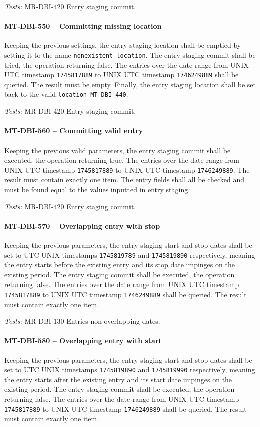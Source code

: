 \textit{Tests: } MR-DBI-420 Entry staging commit.

\paragraph{MT-DBI-550 -- Committing missing location}
Keeping the previous settings,
the entry staging location shall be emptied by setting it to the name
\lstinline{nonexistent_location}.
The entry staging commit shall be tried, the operation returning false.
The entries over the date range from UNIX UTC timestamp \lstinline{1745817889}
to UNIX UTC timestamp \lstinline{1746249889} shall be queried. The result must
be empty. Finally, the entry staging location shall be set back to the valid
\lstinline{location_MT-DBI-440}.

\textit{Tests: } MR-DBI-420 Entry staging commit.

\paragraph{MT-DBI-560 -- Committing valid entry}
Keeping the previous valid parameters,
the entry staging commit shall be executed, the operation returning true.
The entries over the date range from UNIX UTC timestamp \lstinline{1745817889}
to UNIX UTC timestamp \lstinline{1746249889}. The result must contain
exactly one item.
The entry fields shall all be checked and must be found equal to the
values inputted in entry staging.

\textit{Tests: } MR-DBI-420 Entry staging commit.

\paragraph{MT-DBI-570 -- Overlapping entry with stop}
Keeping the previous parameters, the entry staging start and stop dates
shall be set to UTC UNIX timestamps \lstinline{1745819789} and
\lstinline{1745819890} respectively, meaning the entry starts before
the existing entry and its stop date impinges on the existing period.
The entry staging commit shall be executed, the operation returning false.
The entries over the date range from UNIX UTC timestamp \lstinline{1745817889}
to UNIX UTC timestamp \lstinline{1746249889} shall be queried. The result must
contain exactly one item.

\textit{Tests: } MR-DBI-130 Entries non-overlapping dates.

\paragraph{MT-DBI-580 -- Overlapping entry with start}
Keeping the previous parameters, the entry staging start and stop dates
shall be set to UTC UNIX timestamps \lstinline{1745819890} and
\lstinline{1745819990} respectively, meaning the entry starts after
the existing entry and its start date impinges on the existing period.
The entry staging commit shall be executed, the operation returning false.
The entries over the date range from UNIX UTC timestamp \lstinline{1745817889}
to UNIX UTC timestamp \lstinline{1746249889} shall be queried. The result must
contain exactly one item.

